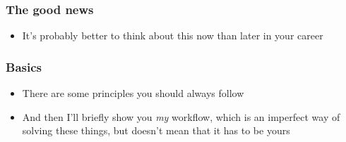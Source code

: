 \documentclass[utf8, xcolor=dvipsnames, handout]{beamer}
\begin{document}
\begin{frame}
\frametitle{The good news}
\centering

\begin{itemize}
  \item It's probably better to think about this now than later in your career
\end{itemize}

\end{frame}

\begin{frame}
\frametitle{Basics}
\centering

\begin{itemize}[<+->]
  \item There are some principles you should always follow
  \item And then I'll briefly show you \textit{my} workflow, which is an imperfect way of solving these things, but doesn't mean that it has to be yours
\end{itemize}

\end{frame}
\end{document}
